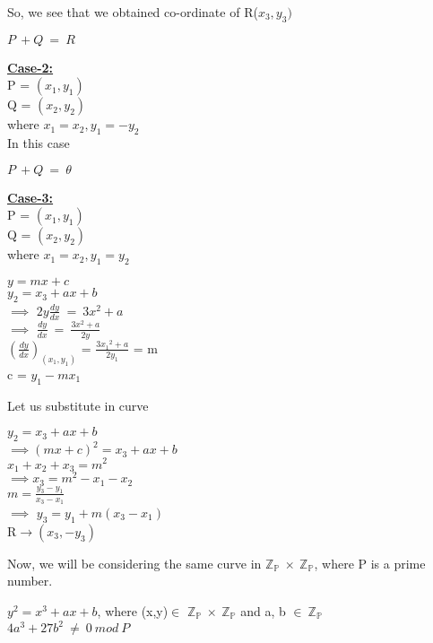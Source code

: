 \documentclass[11pt]{article}
\begin{document}
So, we see that we obtained co-ordinate of R($x_3,y_3)$
\begin{center}
    $P \ \boxed{+} Q\ =\ R$
\end{center}
\textbf{\underline{Case-2:}}\\
P = $(x_1,y_1)$\\
Q = $(x_2,y_2)$\\
where $x_1=x_2, y_1=-y_2$\\
In this case\\
\begin{center}
    $P \ \boxed{+} Q\ =\ \theta$
\end{center}
\textbf{\underline{Case-3:}}\\
P = $(x_1,y_1)$\\
Q = $(x_2,y_2)$\\
where $x_1=x_2, y_1=y_2$\\
\begin{center}
    $y = mx+c$\\
    $y_2=x_3+ax+b$\\
    $\implies$ $2y\frac{dy}{dx}\ =\ 3x^2+a$\\
    $\implies$ $\frac{dy}{dx}\ =\ \frac{3x^2+a}{2y}$\\
    ${(\frac{dy}{dx})}_{(x_1,y_1)}$ = $\frac{3{x_1}^2+a}{2y_1}$ = m\\
    \vspace{3mm}
    c = $y_1-mx_1$\\
\end{center}
Let us substitute in curve
\begin{center}
    $y_2=x_3+ax+b$\\
    $\implies$${(mx+c)}^2 = x_3+ax+b$\\
    $x_1+x_2+x_3=m^2$\\
    $\implies$$x_3=m^2-x_1-x_2$\\
    $m = \frac{y_3-y_1}{x_3-x_1}$\\
    $\implies$ $y_3 = y_1+m(x_3-x_1)$\\
    R$\rightarrow(x_3,-y_3)$\\
\end{center}
Now, we will be considering the same curve in $\mathbb{Z_P}\ \times\ \mathbb{Z_P}$, where P is a prime number.
\begin{center}
    $y^2=x^3+ax+b$, where (x,y)$\in$ $\mathbb{Z_P}\ \times\ \mathbb{Z_P}$ and a, b $\in\ \mathbb{Z_P}$\\
    $4a^3+27b^2\ \neq\ 0\ mod\ P$\\
\end{center}
\end{document}
